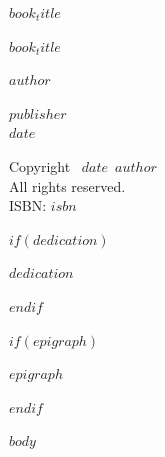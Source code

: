 \documentclass[12pt,ebook]{memoir}
\def\booktitle{$book_title$}
\def\bookauthor{$author$}
\def\bookdate{$date$}
\def\bookpublisher{$publisher$}
\begin{document}
\thispagestyle{empty}
\vspace*{2in}
\begin{raggedright}
\HUGE\scshape\booktitle
\end{raggedright}

\clearpage
\thispagestyle{empty}
\vspace*{1in}
\begin{center}
\HUGE\scshape\booktitle\par
\vspace{1.5in}
\Large\scshape\bookauthor\par
\vfill
\large\scshape\bookpublisher\\
\normalsize\scshape\bookdate
\end{center}

\clearpage
\thispagestyle{empty}
\vspace*{\fill}
\begin{center}
Copyright \textcopyright\ \bookdate\ \bookauthor\\
All rights reserved.\\
ISBN: $isbn$
\end{center}
\vspace*{\fill}

$if(dedication)$
\clearpage
\thispagestyle{empty}
\vspace*{3in}
\begin{center}
\textit{$dedication$}
\end{center}
$endif$

$if(epigraph)$
\clearpage
\begin{center}
\textit{$epigraph$}
\end{center}
$endif$

\clearpage
{}
\tableofcontents*

\mainmatter

$body$
\end{document}
